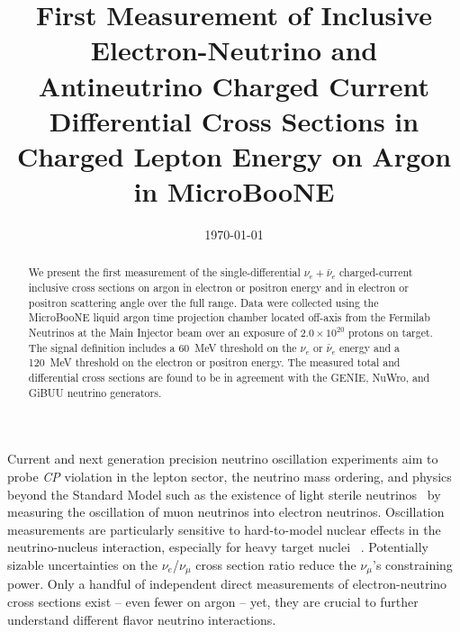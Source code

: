 \documentclass[%
twocolumn,
superscriptaddress,
showpacs,preprintnumbers,
amsmath,amssymb,
aps,
prl,
longbibliography
]{revtex4-1}
\begin{document}
\title{First Measurement of Inclusive Electron-Neutrino and Antineutrino Charged Current Differential Cross Sections in Charged Lepton Energy on Argon in MicroBooNE}




\date{\today}


\begin{abstract}
We present the first measurement of the single-differential $\nu_e + \bar{\nu}_e$ charged-current inclusive cross sections on argon in electron or positron energy and in electron or positron scattering angle over the full range. Data were collected using the MicroBooNE liquid argon time projection chamber located off-axis from the Fermilab Neutrinos at the Main Injector beam over an exposure of $2.0\times10^{20}$ protons on target. The signal definition includes a 60~MeV threshold on the $\nu_e$ or $\bar{\nu}_e$ energy and a 120~MeV threshold on the electron or positron energy. The measured total and differential cross sections are found to be in agreement with the GENIE, NuWro, and GiBUU neutrino generators. 


\end{abstract}



\maketitle
Current and next generation precision neutrino oscillation experiments aim to probe \emph{CP} violation in the lepton sector, the neutrino mass ordering, and physics beyond the Standard Model such as the existence of light sterile neutrinos~\cite{dunecollaboration2020longbaseline, protocollaboration2018hyperkamiokande} by measuring the oscillation of muon neutrinos into electron neutrinos.
Oscillation measurements are particularly sensitive to hard-to-model nuclear effects in the neutrino-nucleus interaction, especially for heavy target nuclei ~\cite{PhysRevLett.123.131801,PhysRevD.98.012004,PhysRevLett.119.082001}. Potentially sizable uncertainties on the $\nu_{e}$/$\nu_{\mu}$ cross section ratio \cite{Day:2012gb,Nikolakopoulos:2019qcr}  reduce the $\nu_{\mu}$'s constraining power.
Only a handful of independent direct measurements of electron-neutrino cross sections exist \cite{PhysRevLett.116.081802,EICHTEN1973281,t2k_nue,Abe2020,PhysRevLett.116.081802}  -- even fewer on argon \cite{Acciarri:2020lhp,PhysRevD.104.052002} -- yet, they are crucial to further understand different flavor neutrino interactions. %
\end{document}
